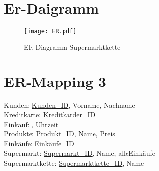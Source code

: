 \newpage
\section{Er-Daigramm}
    \begin{figure}[!htb]
        \centering
        \texttt{[image: ER.pdf]}
        \caption{ER-Diagramm-Supermarktkette}
        \label{caption:ER-Diagramm-Supermarktkette}
    \end{figure}
    

\newpage{}
\section{ER-Mapping 3}
Kunden: \underline{Kunden\_ID}, Vorname, Nachname \\
Kreditkarte: \underline{Kreditkarder\_ID} \\
Einkauf: , Uhrzeit \\
Produkte: \underline{Produkt\_ID}, Name, Preis \\
Einkäufe: \underline{Einkäufe\_ID} \\
Supermarkt: \underline{Supermarkt\_ID}, Name, alleEinkäufe \\ 
Supermarktkette: \underline{Supermarktkette\_ID}, Name

